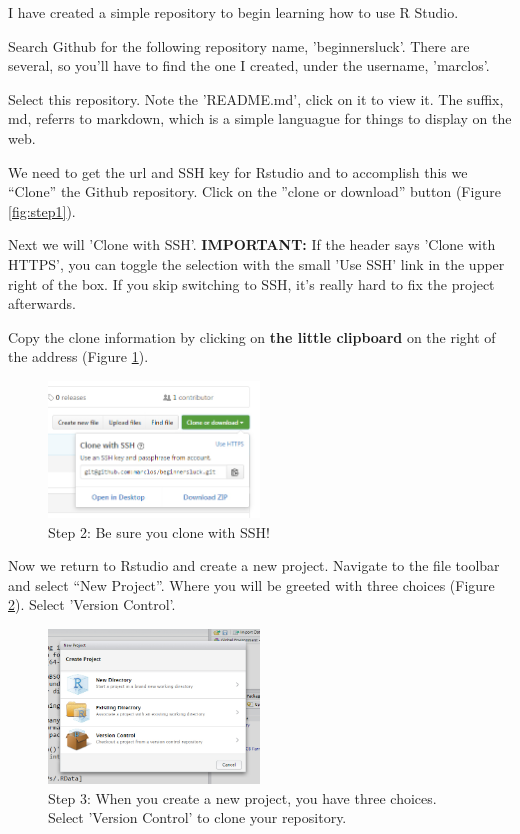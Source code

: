 \documentclass[12pt]{../SOP4_alpha}\usepackage[]{graphicx}\usepackage[]{color}
\begin{document}
\NP I have created a simple repository to begin learning how to use R Studio.

\NP Search Github for the following repository name, 'beginnersluck'. There are several, so you'll have to find the one I created, under the username, 'marclos'. 

\NP Select this repository. Note the 'README.md', click on it to view it. The suffix, md, referrs to markdown, which is a simple languague for things to display on the web.

\NP We need to get the url and SSH key for Rstudio and to accomplish this we ``Clone'' the Github repository. Click on the ''clone or download'' button (Figure \ref{fig:step1}).


\NP Next we will 'Clone with SSH'. \textbf{IMPORTANT:} If the header says 'Clone with HTTPS', you can toggle the selection with the small 'Use SSH' link in the upper right of the box. If you skip switching to SSH, it's really hard to fix the project afterwards. 

\NP Copy the clone information by clicking on \textbf{the little clipboard} on the right of the address (Figure \ref{fig:step2}).

\begin{figure}[H]
\centering
\includegraphics[width=0.5\textwidth]{graphics/CloningGithub2.jpg}
\caption{Step 2: Be sure you clone with SSH!}
\label{fig:step2}
\end{figure}

\NP Now we return to Rstudio and create a new project. Navigate to the file toolbar and select ``New Project''. Where you will be greeted with three choices (Figure \ref{fig:step3}). Select 'Version Control'. 
\begin{figure}[H]
\centering
\includegraphics[width=0.5\textwidth]{graphics/RstudioNewProject.jpg}
\caption{Step 3: When you create a new project, you have three choices. Select 'Version Control' to clone your repository.}
\label{fig:step3}
\end{figure}
\end{document}
